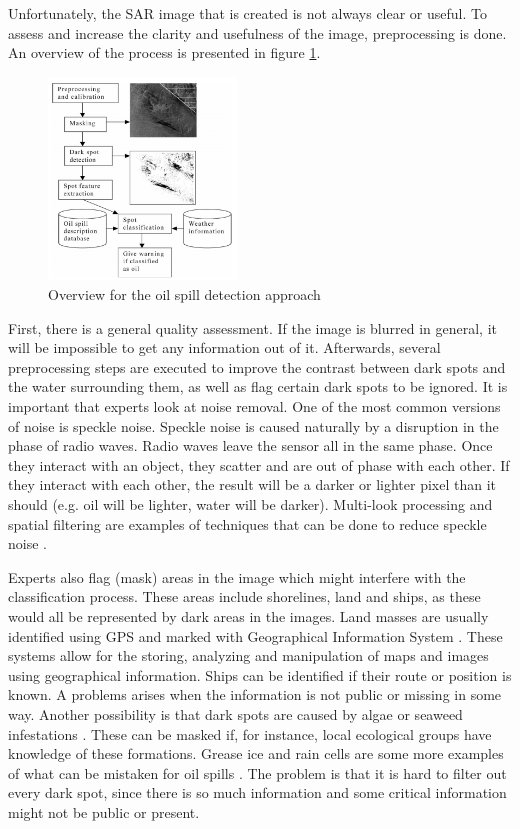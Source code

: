 Unfortunately, the SAR image that is created is not always clear or useful. To assess and increase the clarity and usefulness of the image, preprocessing is done. An overview of the process is presented in figure \ref{fig:overview}.
\begin{figure}[H]
	\centering
    \includegraphics[width=50mm,scale=0.3]{./img/detection_diagram.png}
    \caption{\footnotesize{Overview for the oil spill detection approach \cite{Solberg200745}}}
    \label{fig:overview}
\end{figure}
First, there is a general quality assessment. If the image is blurred in general, it will be impossible to get any information out of it.
Afterwards, several preprocessing steps are executed to improve the contrast between dark spots and the water surrounding them, as well as flag certain dark spots to be ignored. 
It is important that experts look at noise removal. One of the most common versions of noise is speckle noise. Speckle noise is caused naturally by a disruption in the phase of radio waves. Radio waves leave the sensor all in the same phase. Once they interact with an object, they scatter and are out of phase with each other. If they interact with each other, the result will be a darker or lighter pixel than it should (e.g. oil will be lighter, water will be darker). Multi-look processing and spatial filtering are examples of techniques that can be done to reduce speckle noise \cite{simard1998analysis}.

Experts also flag (mask) areas in the image which might interfere with the classification process. These areas include shorelines, land and ships, as these would all be represented by dark areas in the images. Land masses are usually identified using GPS and marked with Geographical Information System \cite{star1990geographic}. These systems allow for the storing, analyzing and manipulation of maps and images using geographical information. Ships can be identified if their route or position is known. A problems arises when the information is not public or missing in some way.
Another possibility is that dark spots are caused by algae or seaweed infestations \cite{fingas2014review}. These can be masked if, for instance, local ecological groups have knowledge of these formations. Grease ice and rain cells are some more examples of what can be mistaken for oil spills \cite{Brekke200595}. The problem is that it is hard to filter out every dark spot, since there is so much information and some critical information might not be public or present.

